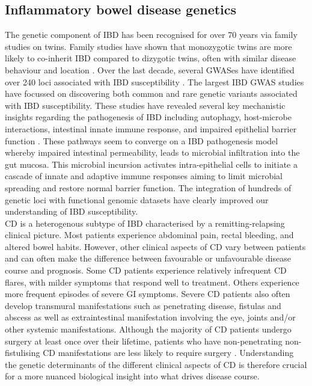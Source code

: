\subsection{Inflammatory bowel disease genetics}
The genetic component of IBD has been recognised for over 70 years via family studies on twins. Family studies have shown that monozygotic twins are more likely to co-inherit IBD compared to dizygotic twins, often with similar disease behaviour and location \cite{Ng2012-mf}. Over the last decade, several GWASes have identified over 240 loci associated with IBD susceptibility \cite{Jostins2012-ig,De_Lange2017-re,Liu2015-bx,Luo2017-kx}. The largest IBD GWAS studies have focussed on discovering both common and rare genetic variants associated with IBD susceptibility. These studies have revealed several key mechanistic insights regarding the pathogenesis of IBD including autophagy, host-microbe interactions, intestinal innate immune response, and impaired epithelial barrier function \cite{Khor2011-td,Jostins2012-ig}. These pathways seem to converge on a IBD pathogenesis model whereby impaired intestinal permeability, leads to microbial infiltration into the gut mucosa. This microbial incursion activates intra-epithelial cells to initiate a cascade of innate and adaptive immune responses aiming to limit microbial spreading and restore normal barrier function. The integration of hundreds of genetic loci with functional genomic datasets have clearly improved our understanding of IBD susceptibility. \\

CD is a heterogenous subtype of IBD characterised by a remitting-relapsing clinical picture. Most patients experience abdominal pain, rectal bleeding, and altered bowel habits. However, other clinical aspects of CD vary between patients and can often make the difference between favourable or unfavourable disease course and prognosis. Some CD patients experience relatively infrequent CD flares, with milder symptoms that respond well to treatment. Others experience more frequent episodes of severe GI symptoms. Severe CD patients also often develop transmural manifestations such as penetrating disease, fistulas and abscess as well as extraintestinal manifestation involving the eye, joints and/or other systemic manifestations. Although the majority of CD patients undergo surgery at least once over their lifetime, patients who have non-penetrating non-fistulising CD manifestations are less likely to require surgery \cite{Lewis2010-gx}. Understanding the genetic determinants of the different clinical aspects of CD is therefore crucial for a more nuanced biological insight into what drives disease course.\\

